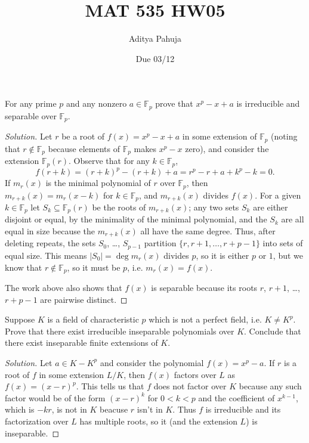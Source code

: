 \documentclass[10pt]{article}
\title{MAT 535 HW05}
\author{\large Aditya Pahuja}
\date{\large Due 03/12}
\providecommand{\FF}{\mathbb F}
\newenvironment{soln}{\begin{proof}[Solution]}{\end{proof}}
\providecommand{\abs}[1]{\left\lvert #1\right\rvert}
\begin{document}
\maketitle

\begin{problem}
    [\S13.5\#5]
    For any prime $p$ and any nonzero $a\in\FF_p$
    prove that $x^p - x + a$ is irreducible and separable over $\FF_p$.
\end{problem}

\begin{soln}
    Let $r$ be a root of $f(x) = x^p - x + a$
    in some extension of $\FF_p$
    (noting that $r\notin\FF_p$ because
    elements of $\FF_p$ makes $x^p - x$ zero),
    and consider the extension $\FF_p(r)$.
    Observe that for any $k\in\FF_p$,
    \begin{equation*}
        f(r + k) = (r + k)^p - (r + k) + a
	= r^p - r + a + k^p - k = 0.
    \end{equation*}
    If $m_r(x)$ is the minimal polynomial of $r$ over $\FF_p$,
    then $m_{r+k}(x) = m_r(x - k)$ for $k\in\FF_p$,
    and $m_{r+k}(x)$ divides $f(x)$.
    For a given $k\in\FF_p$ let $S_k\subseteq\FF_p(r)$
    be the roots of $m_{r+k}(x)$;
    any two sets $S_k$ are either disjoint or equal,
    by the minimality of the minimal polynomial,
    and the $S_k$ are all equal in size because the $m_{r+k}(x)$
    all have the same degree. Thus, after deleting repeats,
    the sets $S_0$, \dots, $S_{p-1}$ partition $\{r,r+1,\dots,r+p-1\}$
    into sets of equal size. This means $\abs{S_0} = \deg m_r(x)$
    divides $p$, so it is either $p$ or $1$,
    but we know that $r\notin\FF_p$, so it must be $p$,
    i.e. $m_r(x) = f(x)$.

    The work above also shows that $f(x)$ is separable
    because its roots $r$, $r+1$, \dots, $r+p-1$ are pairwise distinct.
\end{soln}

\begin{problem}
    [\S13.5\#7]
    Suppose $K$ is a field of characteristic $p$
    which is not a perfect field, i.e. $K\ne K^p$.
    Prove that there exist irreducible inseparable polynomials over $K$.
    Conclude that there exist inseparable finite extensions of $K$.
\end{problem}

\begin{soln}
    Let $a\in K - K^p$ and consider the polynomial $f(x) = x^p - a$.
    If $r$ is a root of $f$ in some extension $L/K$,
    then $f(x)$ factors over $L$ as $f(x) = (x - r)^p$.
    This tells us that $f$ does not factor over $K$
    because any such factor would be of the form
    $(x-r)^k$ for $0 < k < p$ and 
    the coefficient of $x^{k-1}$, which is $-kr$, is not in $K$
    beacuse $r$ isn't in $K$.
    Thus $f$ is irreducible and its factorization
    over $L$ has multiple roots, so it (and the extension $L$)
    is inseparable.
\end{soln}
\end{document}

